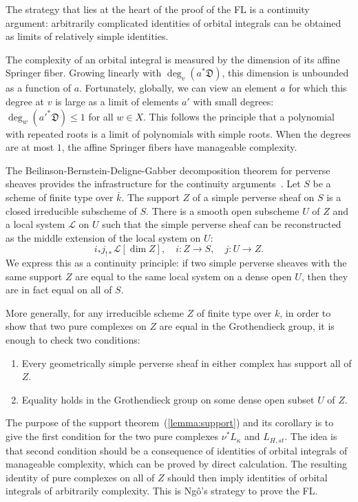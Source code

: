 \documentclass[brochure,english,12pt]{bourbaki}
\theoremstyle{plain}
\def\DIV{{\mathfrak{D}}}
\begin{document}
The strategy that lies at the heart of the proof of the FL is a
continuity argument: arbitrarily complicated identities of orbital
integrals can be obtained as limits  of relatively
simple identities.

The complexity of an orbital integral is measured by the dimension of
its affine Springer fiber.  Growing linearly with $\deg_v(a^* \DIV)$,
this dimension is unbounded as a function of $a$.  Fortunately, globally, we can
view an element $a$ for which this degree at $v$ is large as a
limit of elements $a'$ with small degrees:
$\deg_w({a'}^*\DIV)\le 1$ for all $w\in X$.  This follows the
principle that a polynomial with repeated roots is a limit of
polynomials with simple roots.  When the degrees are at most $1$, the
affine Springer fibers have manageable complexity.


The Beilinson-Bernstein-Deligne-Gabber decomposition theorem for
perverse sheaves provides the infrastructure for the continuity
arguments~\cite{BBDG:1982}.  Let $S$ be a scheme of finite type over
$\bar k$.  The support $Z$ of a simple perverse sheaf on $S$ is a
closed irreducible subscheme of $S$.  There is a smooth open subscheme
$U$ of $Z$ and a local system ${\mathcal L}$ on $U$ such that the
simple perverse sheaf can be reconstructed as the middle extension of
the local system on $U$:
\[
i_* j_{!*} {\mathcal L}[\dim Z], \quad i:Z\to S,\quad j:U\to Z.
\]
We express this as a continuity principle: if two simple perverse
sheaves with the same support $Z$ are equal to the same local system
on a dense open $U$, then they are in fact equal on all of $S$.  

More generally, for any irreducible scheme $Z$ of finite type over
$k$, in order to show that two pure complexes on $Z$ are equal in the
Grothendieck group, it is enough to check two conditions:
\begin{enumerate}
\item Every geometrically simple perverse sheaf in
either complex has support all of $Z$.
\item Equality holds in the
Grothendieck group on some dense open subset $U$ of $Z$.
\end{enumerate}

The purpose of the support theorem~(\ref{lemma:support}) and
its corollary is to give the first condition for the two pure
complexes $\nu^* L_\kappa$ and $L_{H,st}$.  The idea is that second
condition should be a consequence of identities of orbital integrals
of manageable complexity, which can be proved by direct calculation.
The resulting identity of pure complexes on all of $Z$ should then
imply identities of orbital integrals of arbitrarily complexity.
This is Ng\^o's strategy to prove the FL.
\end{document}
